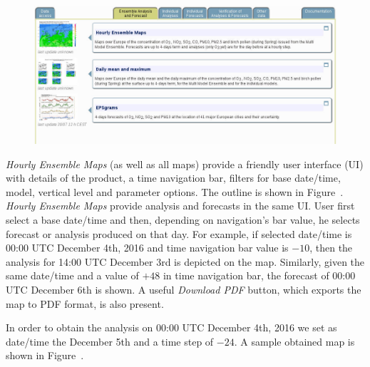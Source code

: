 \documentclass[9pt]{report}
\begin{document}
\begin{figure}[h!]%
\begin{mdcenter}%

\noindent{}\includegraphics[keepaspectratio=true,width=\dimmin{}{\dimwidth{0.90}}]{images/ensemble_tab}{}%

\mdhr{}%

\noindent{}%
\end{mdcenter}\label{ensemble-tab}%
\end{figure}%

\noindent{}\emph{Hourly Ensemble Maps} (as well as all maps) provide a friendly user interface (UI) with details of the product, a time navigation bar, filters for base date/time, model, vertical level and parameter options.
The outline is shown in Figure~.
\emph{Hourly Ensemble Maps} provide analysis and forecasts in the same UI. User first select a base date/time and then, depending on navigation's bar value, he selects forecast or analysis produced on that day.
For example, if selected date/time is 00:00 UTC December 4th, 2016 and time navigation bar value is $-10$, then the analysis for 14:00 UTC December 3rd is depicted on the map.
Similarly, given the same date/time and a value of $+48$ in time navigation bar, the forecast of 00:00 UTC December 6th is shown.
A useful \emph{Download PDF} button, which exports the map to PDF format, is also present.%

In order to obtain the analysis on 00:00 UTC December 4th, 2016 we set as date/time the December 5th and a time step of $-24$.
A sample obtained map is shown in Figure~.%
\end{document}
